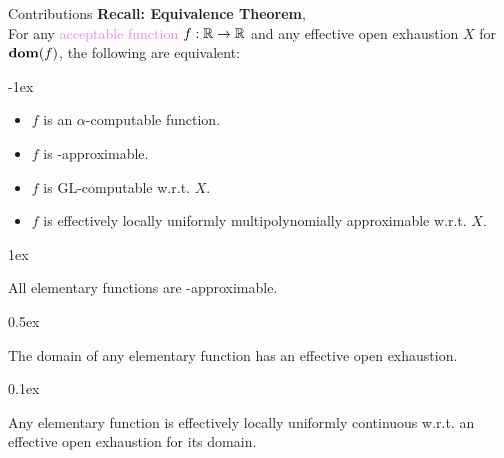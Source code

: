 \begin{frame}{Contributions}
    \vspace{-1em}
    {\color{gray}
    \textcolor{OliveGreen}{\textbf{Recall: Equivalence Theorem}, \citep{ModelOfCompForPartFunc_MingQuanFuAndJeffZucker}}\\
    For any \textcolor{violet}{acceptable function} $f:\mathbb{R}\to\mathbb{R}$ and any {effective open exhaustion} $X$ for $\mathbf{dom}(f)$, the following are equivalent:}

    \kern-1ex
        \begin{itemize}
            \setlength\itemsep{-3pt}\color{gray}
            \item $f$ is an $\alpha$-computable function.
            \item $f$ is \WhileCC-approximable.
            \item $f$ is GL-computable w.r.t. $X$.
            \item $f$ is effectively locally uniformly multipolynomially approximable w.r.t. $X$.
        \end{itemize}

    \kern1ex
    \begin{theorem}
        All elementary functions are \WhileCC-approximable.
    \end{theorem}

    \kern0.5ex
    \begin{theorem}
        The domain of any elementary function has an effective open exhaustion.
    \end{theorem}
    \pause
    
    \kern0.1ex
    \begin{theorem}
        Any elementary function is {effectively locally uniformly continuous} w.r.t.\null{} an effective open exhaustion for its domain.
    \end{theorem}
\end{frame}
